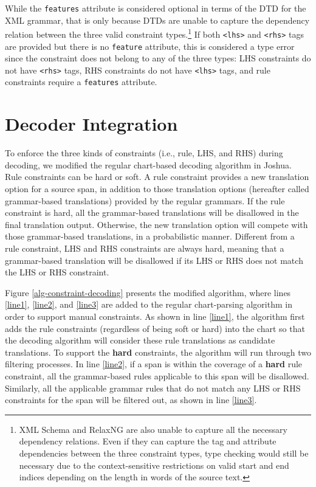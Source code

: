 \documentclass[logo]{pbml}
\begin{document}
While the \texttt{features} attribute is considered optional in terms of the DTD for the XML grammar, that is only because DTDs are unable to capture the dependency relation between the three valid constraint types.\footnote{XML Schema and RelaxNG are also unable to capture all the necessary dependency relations. Even if they can capture the tag and attribute dependencies between the three constraint types, type checking would still be necessary due to the context-sensitive restrictions on valid start and end indices depending on the length in words of the source text.} If both \texttt{<lhs>} and \texttt{<rhs>} tags are provided but there is no \texttt{feature} attribute, this is considered a type error since the constraint does not belong to any of the three types: LHS constraints do not have \texttt{<rhs>} tags, RHS constraints do not have \texttt{<lhs>} tags, and rule constraints require a \texttt{features} attribute.

\section{Decoder Integration}

To enforce the three kinds of constraints (i.e., rule, LHS, and RHS) during decoding, we modified the regular chart-based decoding algorithm in Joshua.
Rule constraints can be hard or soft.
A rule constraint provides a new translation option for a source span,
in addition to those translation options (hereafter called grammar-based translations) provided by the regular grammars.
If the rule constraint is hard, all the grammar-based translations
will be disallowed in the final translation output. Otherwise, the new translation option will
compete with those grammar-based translations, in a probabilistic manner.
Different from a rule constraint, LHS and RHS constraints are always hard, meaning that
a grammar-based translation will be disallowed if its LHS or RHS does not match the LHS or RHS constraint.

Figure \ref{alg-constraint-decoding} presents the
modified algorithm, where lines \ref{line1}, \ref{line2}, and \ref{line3} are added to
the regular chart-parsing algorithm in order to support manual constraints.
As shown in line \ref{line1}, the algorithm first adds the rule constraints (regardless of being soft or hard) into the chart
so that the decoding algorithm will consider these rule translations as candidate translations.
To support the \textbf{hard} constraints, the algorithm will run through two filtering processes.
In line \ref{line2}, if a span is within the coverage of a \textbf{hard} rule constraint,
all the grammar-based rules applicable to this span will be disallowed.
Similarly, all the applicable grammar rules that do not match
any LHS or RHS constraints for the span will be filtered out, as shown in line \ref{line3}.
\end{document}
